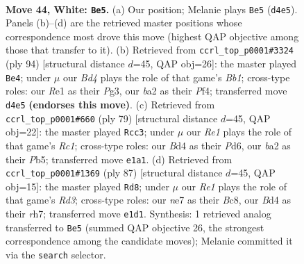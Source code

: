 \documentclass[11pt]{article}
\begin{document}
\clearpage

\begin{figure}[p]\centering
\begin{subfigure}{0.46\textwidth}\centering
\resizebox{\linewidth}{!}{%
\newchessgame
\chessboard[
  setfen={5k2/3Rn3/2r5/1p4p1/r2B4/4P1P1/b4P1P/4R1K1 w - - 6 44},
  showmover=false,
  pgfstyle=straightmove, color=movearrow, markmove={d4-e5}
]}
\caption{}
\end{subfigure}\hfill
\begin{subfigure}{0.46\textwidth}\centering
\resizebox{\linewidth}{!}{%
\newchessgame
\chessboard[
  setfen={5k2/6b1/p7/1p6/5P1P/P3n1PK/1P2R3/1B1r4 w - - 9 48},
  showmover=false,
  pgfstyle=straightmove, color=movearrow, markmove={b1-e4}
]}
\caption{}
\end{subfigure}
\\[4pt]
\begin{subfigure}{0.46\textwidth}\centering
\resizebox{\linewidth}{!}{%
\newchessgame
\chessboard[
  setfen={2r3k1/5p1p/3p2p1/1p2b3/4PN1P/1r6/4R1KB/3R4 b - - 1 40},
  showmover=false,
  pgfstyle=straightmove, color=movearrow, markmove={c8-c3}
]}
\caption{}
\end{subfigure}\hfill
\begin{subfigure}{0.46\textwidth}\centering
\resizebox{\linewidth}{!}{%
\newchessgame
\chessboard[
  setfen={2b5/2R4R/pk1rp3/1p6/2p5/8/PP3P2/2K5 b - - 1 44},
  showmover=false,
  pgfstyle=straightmove, color=movearrow, markmove={d6-d8}
]}
\caption{}
\end{subfigure}
\caption{\textbf{Move 44, White: \texttt{Be5}.} (a) Our position; Melanie plays \texttt{Be5} (\texttt{d4e5}). Panels (b)--(d) are the retrieved master positions whose correspondence most drove this move (highest QAP objective among those that transfer to it). (b) Retrieved from \texttt{ccrl\_top\_p0001\#3324} (ply 94) [structural distance $d$=45, QAP obj=26]: the master played \texttt{Be4}; under $\mu$ our \emph{Bd4} plays the role of that game's \emph{Bb1}; cross-type roles: our \emph{R}e1 as their \emph{P}g3, our \emph{b}a2 as their \emph{P}f4; transferred move \texttt{d4e5} \textbf{(endorses this move)}. (c) Retrieved from \texttt{ccrl\_top\_p0001\#660} (ply 79) [structural distance $d$=45, QAP obj=22]: the master played \texttt{Rcc3}; under $\mu$ our \emph{Re1} plays the role of that game's \emph{Rc1}; cross-type roles: our \emph{B}d4 as their \emph{P}d6, our \emph{b}a2 as their \emph{P}b5; transferred move \texttt{e1a1}. (d) Retrieved from \texttt{ccrl\_top\_p0001\#1369} (ply 87) [structural distance $d$=45, QAP obj=15]: the master played \texttt{Rd8}; under $\mu$ our \emph{Re1} plays the role of that game's \emph{Rd3}; cross-type roles: our \emph{n}e7 as their \emph{B}c8, our \emph{B}d4 as their \emph{r}h7; transferred move \texttt{e1d1}. Synthesis: 1 retrieved analog transferred to \texttt{Be5} (summed QAP objective 26, the strongest correspondence among the candidate moves); Melanie committed it via the \texttt{search} selector.}
\label{fig:thought-m86}
\end{figure}
\end{document}

